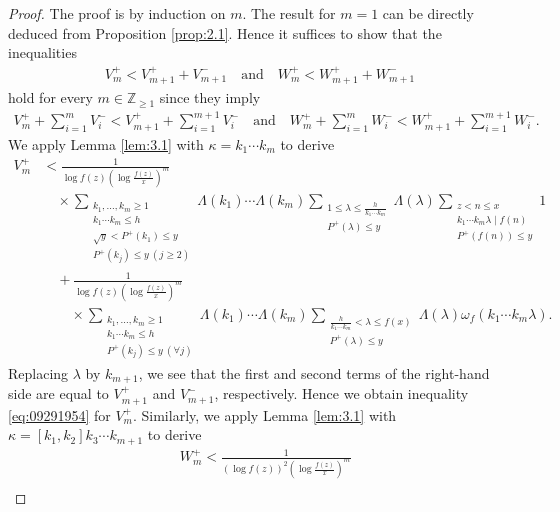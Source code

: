 \documentclass[a4paper,11pt]{amsart}
\theoremstyle{definition}
\numberwithin{equation}{section}
\begin{document}
\begin{proof}
The proof is by induction on $m$. 
The result for $m=1$ can be directly deduced from Proposition \ref{prop:2.1}. 
Hence it suffices to show that the inequalities
\begin{align}\label{eq:09291954}
V_m^+ 
< V_{m+1}^+ +V_{m+1}^-
\quad\text{and}\quad
W_m^+ 
< W_{m+1}^+ +W_{m+1}^-
\end{align}
hold for every $m \in \mathbb{Z}_{\geq1}$ since they imply
\begin{align*}
V_m^+ +\sum_{i=1}^{m} V_i^-
< V_{m+1}^+ +\sum_{i=1}^{m+1} V_i^-
\quad\text{and}\quad
W_m^+ +\sum_{i=1}^{m} W_i^-
< W_{m+1}^+ +\sum_{i=1}^{m+1} W_i^-. 
\end{align*}
We apply Lemma \ref{lem:3.1} with $\kappa=k_1 \cdots k_m$ to derive
\begin{align*}
V_m^+
&< \frac{1}{\log{f(z)} \left(\log{\frac{f(z)}{x}}\right)^m} \\
&\quad \times
\sum_{\substack{k_1,\ldots,k_m \geq 1 \\ k_1 \cdots k_m \leq h \\ \sqrt{y} < P^+(k_1) \leq y \\ P^+(k_j) \leq y ~(j \geq 2)}} 
\Lambda(k_1) \cdots \Lambda(k_m) 
\sum_{\substack{1 \leq \lambda \leq \frac{h}{k_1 \cdots k_m} \\ P^+(\lambda) \leq y}} \Lambda(\lambda)
\sum_{\substack{z<n \leq x \\ k_1 \cdots k_m \lambda \mid f(n) \\ P^+(f(n)) \leq y}}  1 \\
&\quad
+ \frac{1}{\log{f(z)} \left(\log{\frac{f(z)}{x}}\right)^m} \\
&\qquad \times
\sum_{\substack{k_1,\ldots,k_m \geq 1 \\ k_1 \cdots k_m \leq h \\ P^+(k_j) \leq y ~(\forall j)}} 
\Lambda(k_1) \cdots \Lambda(k_m) 
\sum_{\substack{\frac{h}{k_1 \cdots k_m} < \lambda \leq f(x) \\ P^+(\lambda) \leq y}} \Lambda(\lambda)
\omega_f(k_1 \cdots k_m \lambda). 
\end{align*}
Replacing $\lambda$ by $k_{m+1}$, we see that the first and second terms of the right-hand side are equal to $V_{m+1}^+$ and $V_{m+1}^-$, respectively. 
Hence we obtain inequality \eqref{eq:09291954} for $V_m^+$. 
Similarly, we apply Lemma \ref{lem:3.1} with $\kappa=[k_1,k_2] k_3 \cdots k_{m+1}$ to derive
\begin{align*}
&W_m^+
< \frac{1}{(\log{f(z)})^2 \left(\log{\frac{f(z)}{x}}\right)^m} \\

\end{align*}
\end{proof}
\end{document}
